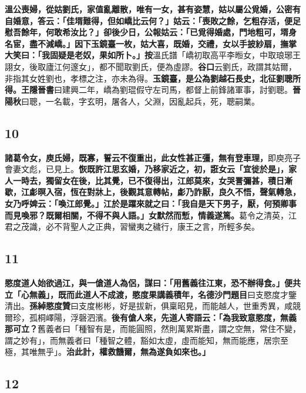\textbf{溫公喪婦，從姑劉氏，家值亂離散，唯有一女，甚有姿慧，姑以屬公覓婚，公密有自婚意，答云：「佳壻難得，但如嶠比云何？」姑云：「喪敗之餘，乞粗存活，便足慰吾餘年，何敢希汝比？」卻後少日，公報姑云：「已覓得婚處，門地粗可，壻身名宦，盡不減嶠。」因下玉鏡臺一枚，姑大喜，既婚，交禮，女以手披紗扇，撫掌大笑曰：「我固疑是老奴，果如所卜。」}{\footnotesize \textbf{按}溫氏譜「嶠初取高平李暅女，中取琅琊王詡女，後取廬江何邃女」，都不聞取劉氏，便為虛謬。\textbf{谷口}云劉氏，政謂其姑爾，非指其女姓劉也，孝標之注，亦未為得。}\textbf{玉鏡臺，是公為劉越石長史，北征劉聰所得。}{\footnotesize \textbf{王隱晉書}曰建興二年，嶠為劉琨假守左司馬，都督上前鋒諸軍事，討劉聰。\textbf{晉陽秋}曰聰，一名載，字玄明，屠各人，父淵，因亂起兵，死，聰嗣業。}

\subsection*{10}

\textbf{諸葛令女，庾氏婦，既寡，誓云不復重出，此女性甚正彊，無有登車理，}{\footnotesize 即庾亮子會妻文彪，已見上。}\textbf{恢既許江思玄婚，乃移家近之，初，誑女云「宜徙於是」，家人一時去，獨留女在後，比其覺，已不復得出，江郎莫來，女哭詈彌甚，積日漸歇，江虨暝入宿，恆在對牀上，後觀其意轉帖，虨乃詐厭，良久不悟，聲氣轉急，女乃呼婢云：「喚江郎覺。」江於是躍來就之曰：「我自是天下男子，厭，何預卿事而見喚邪？既爾相關，不得不與人語。」女默然而慙，情義遂篤。}{\footnotesize 葛令之清英，江君之茂識，必不背聖人之正典，習蠻夷之穢行，康王之言，所輕多矣。}

\subsection*{11}

\textbf{愍度道人始欲過江，與一傖道人為侶，謀曰：「用舊義往江東，恐不辦得食。」便共立「心無義」，既而此道人不成渡，愍度果講義積年，}{\footnotesize \textbf{名德沙門題目}曰支愍度才鑒清出。\textbf{孫綽愍度贊}曰支度彬彬，好是拔新，俱稟昭見，而能越人，世重秀異，咸競爾珍，孤桐嶧陽，浮磬泗濱。}\textbf{後有傖人來，先道人寄語云：「為我致意愍度，無義那可立？}{\footnotesize 舊義者曰「種智有是，而能圓照，然則萬累斯盡，謂之空無，常住不變，謂之妙有」，而無義者曰「種智之體，豁如太虛，虛而能知，無而能應，居宗至極，其唯無乎」。}\textbf{治此計，權救饑爾，無為遂負如來也。」}

\subsection*{12}

